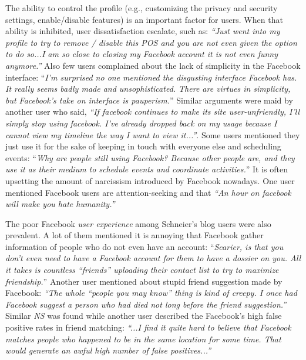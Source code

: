     The ability to control the profile (e.g., customizing the privacy and security settings, enable/disable features) is an important factor for users. When that ability is inhibited, user dissatisfaction escalate, such as: \textit{``Just went into my profile to try to remove / disable this POS and you are not even given the option to do so...I am so close to closing my Facebook account it is not even funny anymore.''} Also few users complained about the lack of simplicity in the Facebook interface:
    ``\textit{I'm surprised no one mentioned the disgusting interface Facebook has. It really seems badly made and unsophisticated. There are virtues in simplicity, but Facebook's take on interface is pauperism.}'' Similar arguments were maid by another user who said, \textit{``If facebook continues to make its site user-unfriendly, I'll simply stop using facebook. I've already dropped back on my usage because I cannot view my timeline the way I want to view it...''}. Some users mentioned they just use it for the sake of keeping in touch with everyone else and scheduling events:
    ``\textit{Why are people still using Facebook? Because other people are, and they use it as their medium to schedule events and coordinate activities.}'' It is often upsetting the amount of narcissism introduced by Facebook nowadays. One user mentioned Facebook users are attention-seeking and that \textit{``An hour on facebook will make you hate humanity.''} 
    
The poor Facebook \textit{user experience} among Schneier's blog users were also prevalent. A lot of them mentioned it is annoying that Facebook gather information of people who do not even have an account: ``\textit{Scarier, is that you don't even need to have a Facebook account for them to have a dossier on you. All it takes is countless ``friends'' uploading their contact list to try to maximize friendship.}'' Another user mentioned about stupid friend suggestion made by Facebook: \textit{``The whole ``people you may know'' thing is kind of creepy. I once had Facebook suggest a person who had died not long before the friend suggestion.''} Similar \emph{NS} was found while another user described the Facebook's high false positive rates in friend matching: \textit{``...I find it quite hard to believe that Facebook matches people who happened to be in the same location for some time. That would generate an awful high number of false positives...''} 
    
